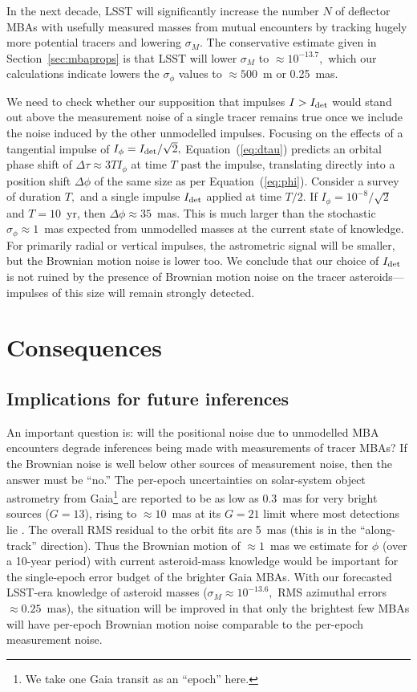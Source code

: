 \documentclass[linenumbers, onecolumn]{aastex631}
\newcommand{\eqq}[1]{Equation~(\ref{#1})}
\begin{document}
 In the next decade, LSST will significantly
increase the number $N$ of deflector MBAs with
usefully measured masses from mutual encounters by tracking hugely
more potential tracers and lowering $\sigma_M.$  The conservative estimate given in Section~\ref{sec:mbaprops} is that LSST will lower $\sigma_M$ to $\approx10^{-13.7},$ which our calculations indicate lowers the $\sigma_\phi$ values to $\approx500$~m or 0.25~mas.

We need to check whether our supposition that impulses $I>I_{\rm det}$
would stand out above the measurement noise of a single tracer remains
true once we include the noise induced by the other unmodelled
impulses.  Focusing on the effects of a tangential impulse of
$I_\phi=I_{\rm det}/\sqrt{2},$ \eqq{eq:dtau} predicts an orbital phase
shift of $\Delta\tau \approx 3TI_\phi$ at time $T$ past the impulse,
translating directly into a position shift $\Delta\phi$ of the same
size as per \eqq{eq:phi}.  Consider a survey of duration $T,$ and a
single impulse $I_{\rm det}$ applied at time $T/2.$ If
$I_\phi=10^{-8}/\sqrt{2}$ and $T=10$~yr, then
$\Delta\phi\approx35$~mas.  This is much larger than the
stochastic $\sigma_\phi\approx1$~mas expected from unmodelled masses at the
current state of knowledge.  For primarily radial or vertical
impulses, the astrometric signal will be smaller, but the Brownian
motion noise is lower too. 
We conclude that our choice of $I_{\rm
det}$ is not ruined by the presence of Brownian motion noise on the
tracer asteroids---impulses of this size will remain strongly detected.

\section{Consequences}
\label{sec:discuss}
\subsection{Implications for future inferences}
  
An important question is: will the positional noise due to unmodelled
MBA encounters degrade inferences being made with measurements of
tracer MBAs?  If the Brownian noise is well below other sources of measurement noise, then the answer must be ``no.''
The per-epoch uncertainties on solar-system object astrometry from Gaia\footnote{We take one Gaia transit as an ``epoch'' here.} are reported to be as low as 0.3~mas for very bright sources ($G=13$), rising to $\approx10$~mas at its $G=21$ limit where most detections lie \citep[][Figure 6]{gaiass3}.  The overall RMS residual to the orbit fits are 5~mas (this is in the ``along-track'' direction).  Thus the Brownian motion of $\approx1$~mas we estimate for $\phi$ (over a 10-year period) with current asteroid-mass knowledge would be important for the single-epoch error budget of the brighter Gaia MBAs.  With our forecasted LSST-era knowledge of asteroid masses ($\sigma_M\approx10^{-13.6},$ RMS azimuthal errors $\approx0.25$~mas), the situation will be improved in that only the brightest few MBAs will have per-epoch Brownian motion noise comparable to the per-epoch measurement noise.
\end{document}
